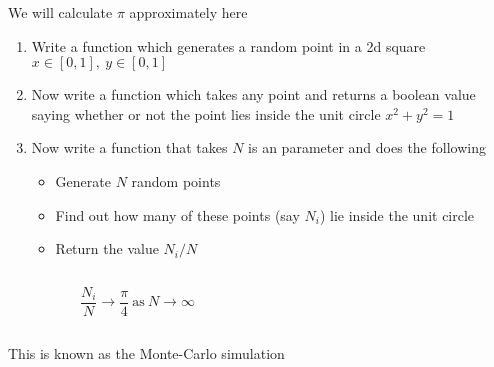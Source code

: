 \begin{frame}[fragile]
    \begin{exercise}
        We will calculate $\pi$ approximately here
        \begin{enumerate}
            \item Write a function  which generates a random point in a 2d square $x \in [0,1],\ y \in [0,1]$\\
            \item<2-> Now write a function  which takes any point and returns a boolean value saying whether or not the point lies inside the unit circle $x^2+y^2=1$
            \item<3-> Now write a function  that takes $N$ is an parameter and does the following
            \begin{itemize}
                \item Generate $N$ random points
                \item Find out how many of these points (say $N_i$) lie inside the unit circle
                \item Return the value $N_i/N$
            \end{itemize}
        \end{enumerate}
        \begin{columns}
            \begin{column}{0.5\linewidth}
                \begin{equation*}
                    \frac{N_i}{N} \to \frac{\pi}{4}\ \text{as}\ N \to \infty
                \end{equation*}
            \end{column}
            \begin{column}{0.5\linewidth}
                \begin{figure}
                    \centering
                \end{figure}
            \end{column}
        \end{columns}
        This is known as the Monte-Carlo simulation
    \end{exercise}
\end{frame}


